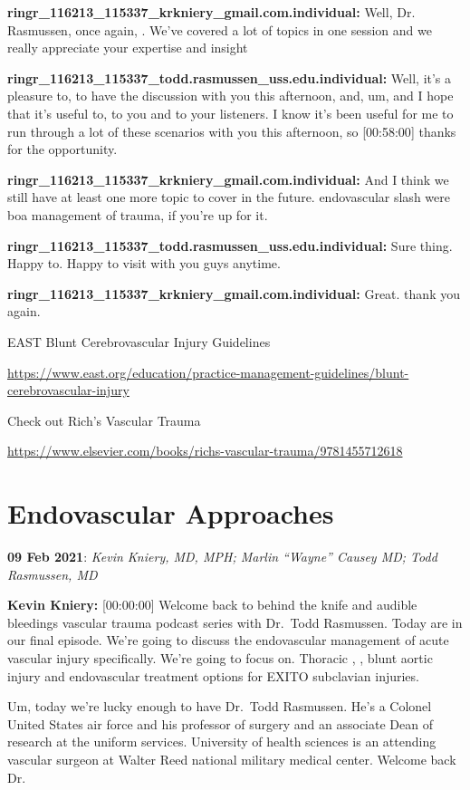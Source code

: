 \documentclass[
]{book}
\begin{document}
\textbf{ringr\_116213\_115337\_krkniery\_gmail.com.individual:} Well, Dr.
Rasmussen, once again, . We've covered a lot of topics in one session
and we really appreciate your expertise and insight

\textbf{ringr\_116213\_115337\_todd.rasmussen\_uss.edu.individual:} Well, it's a
pleasure to, to have the discussion with you this afternoon, and, um,
and I hope that it's useful to, to you and to your listeners. I know
it's been useful for me to run through a lot of these scenarios with you
this afternoon, so {[}00:58:00{]} thanks for the opportunity.

\textbf{ringr\_116213\_115337\_krkniery\_gmail.com.individual:} And I think we
still have at least one more topic to cover in the future. endovascular
slash were boa management of trauma, if you're up for it.

\textbf{ringr\_116213\_115337\_todd.rasmussen\_uss.edu.individual:} Sure thing.
Happy to. Happy to visit with you guys anytime.

\textbf{ringr\_116213\_115337\_krkniery\_gmail.com.individual:} Great. thank you
again.

EAST Blunt Cerebrovascular Injury Guidelines

\url{https://www.east.org/education/practice-management-guidelines/blunt-cerebrovascular-injury}

Check out Rich's Vascular Trauma

\url{https://www.elsevier.com/books/richs-vascular-trauma/9781455712618}

\hypertarget{endovascular-approaches}{%
\section{Endovascular Approaches}\label{endovascular-approaches}}

\textbf{09 Feb 2021}: \emph{Kevin Kniery, MD, MPH; Marlin ``Wayne'' Causey MD; Todd
Rasmussen, MD}

\textbf{Kevin Kniery:} {[}00:00:00{]} Welcome back to behind the knife and
audible bleedings vascular trauma podcast series with Dr.~Todd
Rasmussen. Today are in our final episode. We're going to discuss the
endovascular management of acute vascular injury specifically. We're
going to focus on. Thoracic , , blunt aortic injury and endovascular
treatment options for EXITO subclavian injuries.

Um, today we're lucky enough to have Dr.~Todd Rasmussen. He's a Colonel
United States air force and his professor of surgery and an associate
Dean of research at the uniform services. University of health sciences
is an attending vascular surgeon at Walter Reed national military
medical center. Welcome back Dr.
\end{document}

